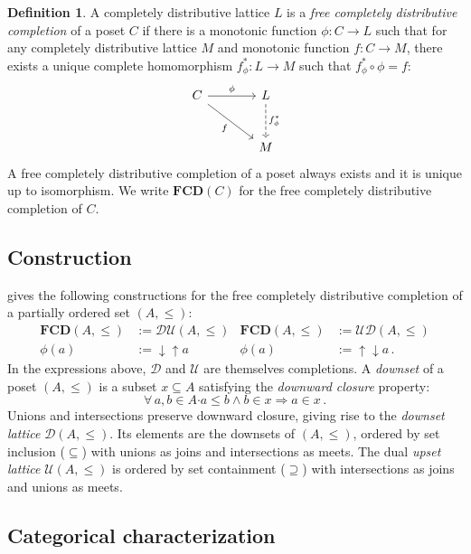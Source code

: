\documentclass[draft,11pt]{report}
\theoremstyle{definition}
\newtheorem{definition}[theorem]{Definition}
\newcommand{\bdot}{\boldsymbol{\cdot}}
\begin{document}
\begin{definition}
A completely distributive lattice $L$ is a
\emph{free completely distributive completion} of
a poset $C$ if there is
a monotonic function $\phi : C \rightarrow L$
such that
for any completely distributive lattice $M$
and monotonic function $f : C \rightarrow M$,
there exists a unique complete homomorphism $f^*_\phi : L \rightarrow M$
such that $f^*_\phi \circ \phi = f$:
\[
  \begin{tikzcd}[sep=large]
    C \arrow[r, "\phi"] \arrow[rd, "f"'] &
    L \arrow[d, "f^*_\phi", dashed] \\ & M
  \end{tikzcd}
\]
A free completely distributive completion of a poset
always exists and it is unique up to isomorphism.
We write $\mathbf{FCD}(C)$ for
the free completely distributive completion of $C$.
\end{definition}

\subsection{Construction}

\citet{augtyp} gives the following constructions for
the free completely distributive completion of
a partially ordered set $(A, \le)$:
\begin{align*}
  \mathbf{FCD}(A, {\le}) &:= \mathcal{D} \mathcal{U}(A, {\le}) &
  \mathbf{FCD}(A, {\le}) &:= \mathcal{U} \mathcal{D}(A, {\le}) \\
  \phi(a) &:= {\downarrow}{\uparrow} a &
  \phi(a) &:= {\uparrow}{\downarrow} a \,.
\end{align*}
In the expressions above,
$\mathcal{D}$ and $\mathcal{U}$
are themselves completions.
A \emph{downset} of a poset $(A, {\le})$
is a subset $x \subseteq A$ satisfying
the \emph{downward closure} property:
\[
  \forall \, a, b \in A \bdot
          a \le b \wedge b \in x \Rightarrow a \in x \,.
\]
Unions and intersections preserve downward closure,
giving rise to the \emph{downset lattice} $\mathcal{D}(A, {\le})$.
Its elements are the downsets of $(A, {\le})$,
ordered by set inclusion (${\subseteq}$) with
unions as joins and intersections as meets.
The dual \emph{upset lattice} $\mathcal{U}(A, {\le})$
is ordered by set containment (${\supseteq}$) with
intersections as joins and unions as meets.

\subsection{Categorical characterization}
\end{document}

